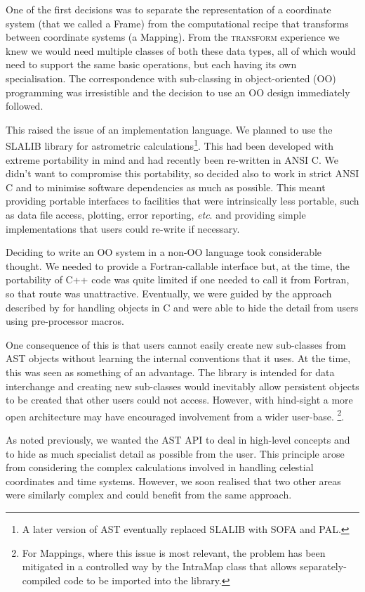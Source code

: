 \documentclass[final,authoryear,5p,times,twocolumn]{elsarticle}
\begin{document}
One of the first decisions was to
separate the representation of a coordinate system (that we called a
Frame) from the computational recipe that transforms between
coordinate systems (a Mapping). From the \textsc{transform} experience
we knew we would need multiple classes of both these data types, all
of which would need to support the same basic operations, but each
having its own specialisation. The correspondence with sub-classing in
object-oriented (OO) programming was irresistible and the decision to
use an OO design immediately followed.

This raised the issue of an implementation language. We planned to use
the SLALIB library for astrometric calculations\footnote{A later version
of AST eventually replaced SLALIB with SOFA and PAL.}. This had been
developed with extreme portability in mind and had recently been
re-written in ANSI C. We didn't want to compromise this portability,
so decided also to work in strict ANSI C and to minimise software
dependencies as much as possible. This meant providing portable
interfaces to facilities that were intrinsically less portable, such
as data file access, plotting, error reporting, \emph{etc}. and providing
simple implementations that users could re-write if necessary.

Deciding to write an OO system in a non-OO language took considerable
thought. We needed to provide a Fortran-callable interface but, at the
time, the portability of C++ code was quite limited if one needed to
call it from Fortran, so that route was unattractive. Eventually, we
were guided by the approach described by \citet{1992Holub} for
handling objects in C and were able to hide the detail from users
using pre-processor macros.

One consequence of this is that users cannot easily create new
sub-classes from AST objects without learning the internal conventions
that it uses. At the time, this was seen as something of an advantage.
The library is intended for data interchange and creating new
sub-classes would inevitably allow persistent objects to be created
that other users could not access. However, with hind-sight a more open
architecture may have encouraged involvement from a wider user-base.
\footnote{For Mappings, where this
  issue is most relevant, the problem has been mitigated in a
  controlled way by the IntraMap class that allows separately-compiled
  code to be imported into the library.}.

As noted previously, we wanted the AST API to deal in high-level
concepts and to hide as much specialist detail as possible from the
user. This principle arose from considering the complex calculations
involved in handling celestial coordinates and time systems. However,
we soon realised that two other areas were similarly complex and could
benefit from the same approach.
\end{document}
